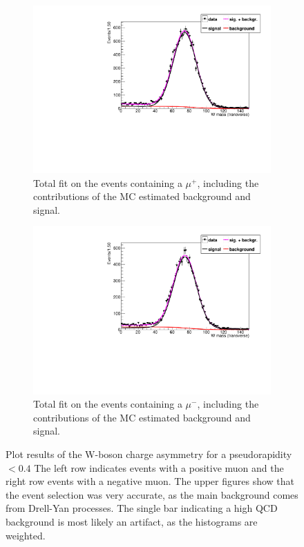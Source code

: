 \documentclass[%
 reprint,
 amsmath,amssymb,
 aps,
]{revtex4-2}
\begin{document}
\begin{figure}
        \begin{subfigure}[b]{0.475\textwidth}   
            \centering 
            \includegraphics[width=\textwidth]{Plots/part2/sig_fit_bkg_positive_0.pdf}
            \caption{Total fit on the events containing a $\mu^+$, including the contributions of the MC estimated background and signal.}   
            \label{fig:W_asym_c}
        \end{subfigure}
        \hfill
        \begin{subfigure}[b]{0.475\textwidth}   
            \centering 
            \includegraphics[width=\textwidth]{Plots/part2/sig_fit_bkg_negative_0.pdf}
            \caption{Total fit on the events containing a $\mu^-$, including the contributions of the MC estimated background and signal.}   
            \label{fig:W_asym_d}
        \end{subfigure}
        \caption{Plot results of the W-boson charge asymmetry for a pseudorapidity $< 0.4$ The left row indicates events with a positive muon and the right row events with a negative muon. The upper figures show that the event selection was very accurate, as the main background comes from Drell-Yan processes. The single bar indicating a high QCD background is most likely an artifact, as the histograms are weighted.}
        \label{fig:W_asym}
\end{figure}
\end{document}
